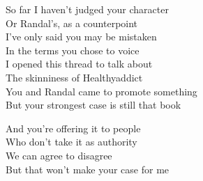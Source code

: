 \begin{lyrics}
So far I haven't judged your character\\
Or Randal's, as a counterpoint\\
I've only said you may be mistaken\\
In the terms you chose to voice\\
I opened this thread to talk about\\
The skinniness of Healthyaddict\\
You and Randal came to promote something\\
But your strongest case is still that book

And you're offering it to people\\
Who don't take it as authority\\
We can agree to disagree\\
But that won't make your case for me
\end{lyrics}

